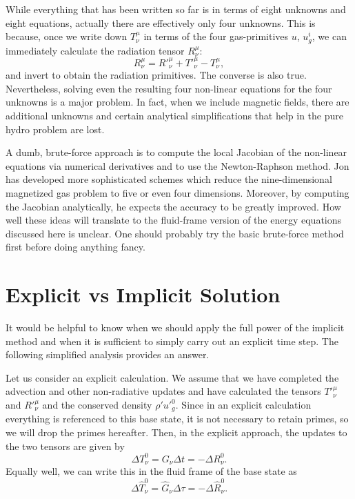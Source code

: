 \documentclass[12pt,preprint]{aastex}
\begin{document}
While everything that has been written so far is in terms of eight
unknowns and eight equations, actually there are effectively only four
unknowns. This is because, once we write down $T^\mu_\nu$ in terms of
the four gas-primitives $u$, $u^i_g$, we can immediately calculate the
radiation tensor $R^\mu_\nu$:
\begin{equation}
R^\mu_\nu = R'^\mu_\nu + T'^\mu_\nu - T^\mu_\nu,
\end{equation}
and invert to obtain the radiation primitives. The converse is also
true.  Nevertheless, solving even the resulting four non-linear
equations for the four unknowns is a major problem. In fact, when we
include magnetic fields, there are additional unknowns and certain
analytical simplifications that help in the pure hydro problem are
lost. 

A dumb, brute-force approach is to compute the local Jacobian of the
non-linear equations via numerical derivatives and to use the
Newton-Raphson method.  Jon has developed more sophisticated schemes
which reduce the nine-dimensional magnetized gas problem to five or
even four dimensions. Moreover, by computing the Jacobian
analytically, he expects the accuracy to be greatly improved. How well
these ideas will translate to the fluid-frame version of the energy
equations discussed here is unclear.  One should probably try the
basic brute-force method first before doing anything fancy.

\section{Explicit vs Implicit Solution}

It would be helpful to know when we should apply the full power of the
implicit method and when it is sufficient to simply carry out an
explicit time step. The following simplified analysis provides an
answer.

Let us consider an explicit calculation. We assume that we have
completed the advection and other non-radiative updates and have
calculated the tensors $T'^\mu_\nu$ and $R'^\mu_\nu$ and the conserved
density $\rho' u'^0_g$. Since in an explicit calculation everything is
referenced to this base state, it is not necessary to retain primes,
so we will drop the primes hereafter. Then, in the explicit approach,
the updates to the two tensors are given by
\begin{equation}
\Delta T^0_\nu = G_\nu \Delta t = -\Delta R^0_\nu.
\end{equation}
Equally well, we can write this in the fluid frame of the base state
as
\begin{equation}
\Delta \widehat{T}^0_\nu = \widehat{G}_\nu \Delta \tau = -\Delta
\widehat{R}^0_\nu.
\end{equation}
\end{document}

